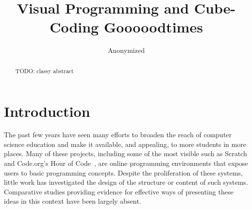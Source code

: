 \documentclass{sig-alternate}
\newcommand{\TODO}[1]{{\color{red} TODO: #1}}
\begin{document}
%

\title{Visual Programming and Cube-Coding Gooooodtimes}

\author{Anonymized}


\maketitle
\begin{abstract}
\TODO{classy abstract}
\end{abstract}




\section{Introduction}
The past few years have seen many efforts to broaden the reach of computer science education and make it available, and appealing, to more students in more places. 
Many of these projects, including some of the most visible such as Scratch and Code.org's Hour of Code~\cite{codedotorg}, are online programming environments that expose users to basic programming concepts. 
Despite the proliferation of these systems, little work has investigated the design of the structure or content of such systems. 
Comparative studies providing evidence for effective ways of presenting these ideas in this context have been largely absent. 
\end{document}
